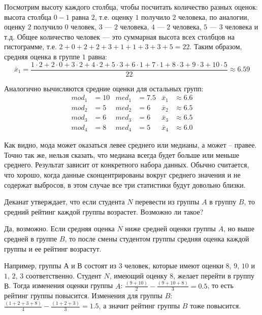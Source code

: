 \documentclass[12pt, a4paper, oneside]{article}
\theoremstyle{plain} %
\theoremstyle{definition}
\newcounter{problem}%
\renewcommand{\theproblem}{\arabic{problem}}
\newenvironment{problem}{
\addtocounter{problem}{1}\noindent{ \color{titleblue} \large \bfseries Упражнение~\theproblem \vspace{1ex} \newline}
}{ }
\begin{document}
\begin{solution}
Посмотрим высоту каждого столбца, чтобы посчитать количество разных оценок: высота столбца $0-1$ равна $2$, т.е. оценку $1$ получило $2$ человека, по аналогии, оценку $2$ получило $0$ человек, $3$ --- $2$ человека, $4$ --- $2$ человека, $5$ --- $3$ человека и т.д.  Общее количество человек --- это суммарная высота всех столбцов на гистограмме, т.е. $2 + 0 + 2 + 2 + 3 + 1 + 1 + 3 + 3 + 5 = 22$.
Таким образом, средняя оценка в группе $1$ равна:
$$
\bar x_1 = \frac{1 \cdot 2 + 2 \cdot 0 + 3 \cdot 2 + 4 \cdot 2 + 5 \cdot 3 + 6 \cdot 1 + 7 \cdot 1 + 8 \cdot 3 + 9 \cdot 3 + 10 \cdot 5}{22} \approx 6.59
$$

Аналогично вычисляются средние оценки для остальных групп:
\begin{align*}
    mod_1 &= 10 &med_1 &= 7.5 &{\bar x_1} &\approx 6.6\\
    mod_2 &= 5 &med_2 &= 6 &{\bar x_2} &\approx 6.5\\
    mod_3 &= 6 &med_3 &= 6 &{\bar x_3} &\approx 6.5\\
    mod_4 &= 8 &med_4 &= 5 &{\bar x_4} &\approx 6.0
\end{align*}

Как видно, мода может оказаться левее среднего или медианы, а может -- правее. Точно так же, нельзя сказать, что медиана всегда будет больше или меньше среднего. Результат зависит от конкретного набора данных. Обычно считается, что хорошо, когда данные сконцентрированы вокруг среднего значения и не содержат выбросов, в этом случае все три статистики будут довольно близки.
\end{solution}

\begin{problem}
Деканат утверждает, что если студента $N$ перевести из группы $A$ в группу $B$, то средний рейтинг каждой группы возрастет. Возможно ли такое?
\end{problem}

\begin{solution}
Да, возможно. Если средняя оценка $N$ ниже средней оценки группы $A$, но выше средней в группе $B$, то после смены студентом группы средняя оценка каждой группы и ее рейтинг возрастут.

Например, группы $А$ и $В$ состоят из $3$ человек, которые имеют оценки $8$, $9$, $10$ и $1$, $2$, $3$ соответственно. Студент $N$, имеющий оценку $8$, желает перейти в группу $В$. Тогда изменения оценки группы $A$:  $\frac{(9+10)}{2} - \frac{(9+10+8)}{3} = 0.5$, то есть рейтинг группы повысится. Изменения для группы $B$:   $\frac{(1+2+3+8)}{4} - \frac{(1+2+3)}{3} = 1.5$, а значит рейтинг группы $B$ тоже повысится.
\end{solution}
\end{document}
